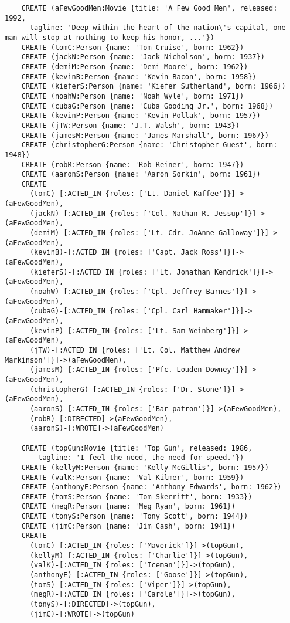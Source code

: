 \begin{lstlisting}
	CREATE (aFewGoodMen:Movie {title: 'A Few Good Men', released: 1992,
	  tagline: 'Deep within the heart of the nation\'s capital, one man will stop at nothing to keep his honor, ...'})
	CREATE (tomC:Person {name: 'Tom Cruise', born: 1962})
	CREATE (jackN:Person {name: 'Jack Nicholson', born: 1937})
	CREATE (demiM:Person {name: 'Demi Moore', born: 1962})
	CREATE (kevinB:Person {name: 'Kevin Bacon', born: 1958})
	CREATE (kieferS:Person {name: 'Kiefer Sutherland', born: 1966})
	CREATE (noahW:Person {name: 'Noah Wyle', born: 1971})
	CREATE (cubaG:Person {name: 'Cuba Gooding Jr.', born: 1968})
	CREATE (kevinP:Person {name: 'Kevin Pollak', born: 1957})
	CREATE (jTW:Person {name: 'J.T. Walsh', born: 1943})
	CREATE (jamesM:Person {name: 'James Marshall', born: 1967})
	CREATE (christopherG:Person {name: 'Christopher Guest', born: 1948})
	CREATE (robR:Person {name: 'Rob Reiner', born: 1947})
	CREATE (aaronS:Person {name: 'Aaron Sorkin', born: 1961})
	CREATE
	  (tomC)-[:ACTED_IN {roles: ['Lt. Daniel Kaffee']}]->(aFewGoodMen),
	  (jackN)-[:ACTED_IN {roles: ['Col. Nathan R. Jessup']}]->(aFewGoodMen),
	  (demiM)-[:ACTED_IN {roles: ['Lt. Cdr. JoAnne Galloway']}]->(aFewGoodMen),
	  (kevinB)-[:ACTED_IN {roles: ['Capt. Jack Ross']}]->(aFewGoodMen),
	  (kieferS)-[:ACTED_IN {roles: ['Lt. Jonathan Kendrick']}]->(aFewGoodMen),
	  (noahW)-[:ACTED_IN {roles: ['Cpl. Jeffrey Barnes']}]->(aFewGoodMen),
	  (cubaG)-[:ACTED_IN {roles: ['Cpl. Carl Hammaker']}]->(aFewGoodMen),
	  (kevinP)-[:ACTED_IN {roles: ['Lt. Sam Weinberg']}]->(aFewGoodMen),
	  (jTW)-[:ACTED_IN {roles: ['Lt. Col. Matthew Andrew Markinson']}]->(aFewGoodMen),
	  (jamesM)-[:ACTED_IN {roles: ['Pfc. Louden Downey']}]->(aFewGoodMen),
	  (christopherG)-[:ACTED_IN {roles: ['Dr. Stone']}]->(aFewGoodMen),
	  (aaronS)-[:ACTED_IN {roles: ['Bar patron']}]->(aFewGoodMen),
	  (robR)-[:DIRECTED]->(aFewGoodMen),
	  (aaronS)-[:WROTE]->(aFewGoodMen)
	
	CREATE (topGun:Movie {title: 'Top Gun', released: 1986,
	    tagline: 'I feel the need, the need for speed.'})
	CREATE (kellyM:Person {name: 'Kelly McGillis', born: 1957})
	CREATE (valK:Person {name: 'Val Kilmer', born: 1959})
	CREATE (anthonyE:Person {name: 'Anthony Edwards', born: 1962})
	CREATE (tomS:Person {name: 'Tom Skerritt', born: 1933})
	CREATE (megR:Person {name: 'Meg Ryan', born: 1961})
	CREATE (tonyS:Person {name: 'Tony Scott', born: 1944})
	CREATE (jimC:Person {name: 'Jim Cash', born: 1941})
	CREATE
	  (tomC)-[:ACTED_IN {roles: ['Maverick']}]->(topGun),
	  (kellyM)-[:ACTED_IN {roles: ['Charlie']}]->(topGun),
	  (valK)-[:ACTED_IN {roles: ['Iceman']}]->(topGun),
	  (anthonyE)-[:ACTED_IN {roles: ['Goose']}]->(topGun),
	  (tomS)-[:ACTED_IN {roles: ['Viper']}]->(topGun),
	  (megR)-[:ACTED_IN {roles: ['Carole']}]->(topGun),
	  (tonyS)-[:DIRECTED]->(topGun),
	  (jimC)-[:WROTE]->(topGun)
	

\end{lstlisting}
